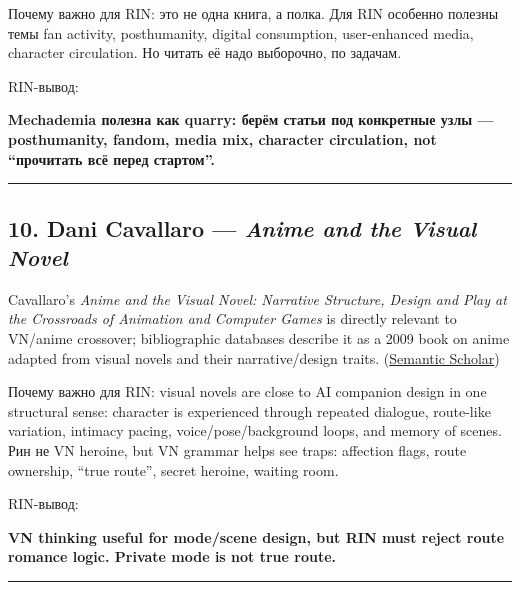 Почему важно для RIN: это не одна книга, а полка. Для RIN особенно
полезны темы fan activity, posthumanity, digital consumption,
user-enhanced media, character circulation. Но читать её надо выборочно,
по задачам.

RIN-вывод:

\textbf{Mechademia полезна как quarry: берём статьи под конкретные узлы
--- posthumanity, fandom, media mix, character circulation, not
``прочитать всё перед стартом''.}

\begin{center}\rule{0.5\linewidth}{0.5pt}\end{center}

\subsection*{\texorpdfstring{10. Dani Cavallaro --- \emph{Anime and the
Visual Novel}}{10. Dani Cavallaro --- Anime and the Visual Novel}}

Cavallaro's \emph{Anime and the Visual Novel: Narrative Structure,
Design and Play at the Crossroads of Animation and Computer Games} is
directly relevant to VN/\hspace{0pt}anime crossover; bibliographic databases
describe it as a 2009 book on anime adapted from visual novels and their
narrative/\hspace{0pt}design traits.
(\href{https://www.semanticscholar.org/paper/Anime-and-the-Visual-Novel\%3A-Narrative-Structure\%2C-at-Cavallaro/a3dc02e7820dc806af347a9095e98c9d9788abb1?utm_source=chatgpt.com}{Semantic
Scholar})

Почему важно для RIN: visual novels are close to AI companion design in
one structural sense: character is experienced through repeated
dialogue, route-like variation, intimacy pacing, voice/\hspace{0pt}pose/\hspace{0pt}background
loops, and memory of scenes. Рин не VN heroine, but VN grammar helps see
traps: affection flags, route ownership, ``true route'', secret heroine,
waiting room.

RIN-вывод:

\textbf{VN thinking useful for mode/\hspace{0pt}scene design, but RIN must reject
route romance logic. Private mode is not true route.}

\begin{center}\rule{0.5\linewidth}{0.5pt}\end{center}

